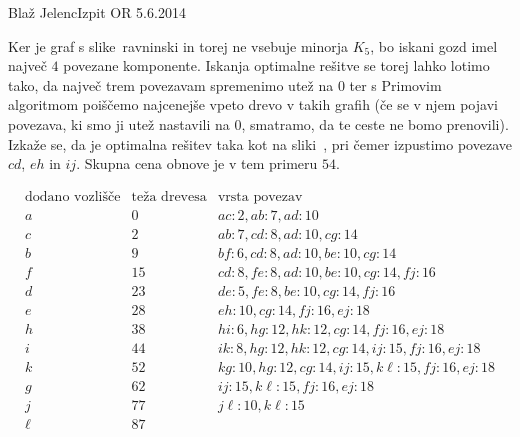 \begin{naloga}{Blaž Jelenc}{Izpit OR 5.6.2014}
\begin{odgovor}
\begin{enumerate}[(a)]
Ker je graf s slike~\fig ravninski in torej ne vsebuje minorja $K_5$,
bo iskani gozd imel največ $4$ povezane komponente.
Iskanja optimalne rešitve se torej lahko lotimo tako,
da največ trem povezavam spremenimo utež na $0$
ter s Primovim algoritmom poiščemo najcenejše vpeto drevo v takih grafih
(če se v njem pojavi povezava, ki smo ji utež nastavili na $0$,
smatramo, da te ceste ne bomo prenovili).
Izkaže se, da je optimalna rešitev taka kot na sliki~,
pri čemer izpustimo povezave $cd$, $eh$ in $ij$.
Skupna cena obnove je v tem primeru $54$.
\end{enumerate}
%
\begin{tabela}
$$
\begin{array}{c|c|l}
\text{dodano vozlišče} & \text{teža drevesa} & \text{vrsta povezav} \\ \hline
a &  0 & ac: 2, ab: 7, ad: 10 \\
c &  2 & ab: 7, cd: 8, ad: 10, cg: 14 \\
b &  9 & bf: 6, cd: 8, ad: 10, be: 10, cg: 14 \\
f & 15 & cd: 8, fe: 8, ad: 10, be: 10, cg: 14, fj: 16 \\
d & 23 & de: 5, fe: 8, be: 10, cg: 14, fj: 16 \\
e & 28 & eh: 10, cg: 14, fj: 16, ej: 18 \\
h & 38 & hi: 6, hg: 12, hk: 12, cg: 14, fj: 16, ej: 18 \\
i & 44 & ik: 8, hg: 12, hk: 12, cg: 14, ij: 15, fj: 16, ej: 18 \\
k & 52 & kg: 10, hg: 12, cg: 14, ij: 15, k\ell: 15, fj: 16, ej: 18 \\
g & 62 & ij: 15, k\ell: 15, fj: 16, ej: 18 \\
j & 77 & j\ell: 10, k\ell: 15 \\
\ell & 87 &
\end{array}
$$
\end{tabela}
%
\begin{slika}
\end{slika}
\end{odgovor}
\end{naloga}
